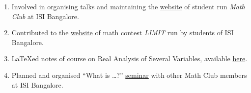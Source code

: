 \documentclass[a4paper, oneside, final]{scrartcl} %
\begin{document}
\begin{enumerate}[label = $\bullet$]
  \item Involved in organising talks and maintaining the \href{https://mathclubisib.github.io}{website} of student run \textit{Math Club} at ISI Bangalore.
  \item Contributed to the \href{https://www.limitisi.in}{website} of math contest \textit{LIMIT} run by students of ISI Bangalore.
  \item LaTeXed notes of course on Real Analysis of Several Variables, available \href{https://awnathan1893.github.io/Analysis3_Notes/}{here}.
  \item Planned and organised ``What is \dots ?'' \href{https://mathclubisib.github.io/seminars/what_is/}{seminar} with other Math Club members at ISI Bangalore.

\end{enumerate}

\end{document}
